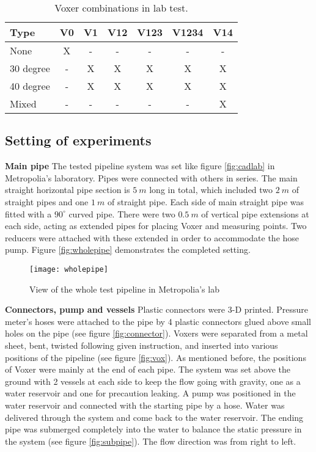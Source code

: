 \begin{table}[h]
  \centering
  \caption{Voxer combinations in lab test.}
  \begin{tabular}{l*{6}{c}}
Type             & V0 & V1 & V12 & V123 & V1234 & V14 \\
\hline
None & X & - & - & - & - & -   \\
30 degree           & - & X & X & X &  X & X  \\
40 degree           & - & X & X & X &  X & X   \\
Mixed     & - & - & - & - & - & X   \\
\end{tabular}
  \label{table:combi}
\end{table}

\subsection{Setting of experiments}

\textbf{Main pipe} \newline
The tested pipeline system was set like figure \vref{fig:cadlab} in Metropolia’s laboratory.  Pipes were connected with others in series. The main straight horizontal pipe section is $5\ m$ long in total, which included two $2\ m$ of straight pipes and one $1\ m$ of straight pipe. Each side of main straight pipe was fitted with a $90^{\circ}$ curved pipe. There were two $0.5\ m$ of vertical pipe extensions at each side, acting as extended pipes for placing Voxer and measuring points. Two reducers were attached with these extended in order to accommodate the hose pump. Figure \vref{fig:wholepipe} demonstrates the completed setting.

\begin{figure}[h]
  \centering
  \texttt{[image: wholepipe]}
  \caption{View of the whole test pipeline in Metropolia's lab }
  \label{fig:wholepipe}
\end{figure}
\newpage

\textbf{Connectors, pump and vessels}\newline
Plastic connectors were 3-D printed. Pressure meter’s hoses were attached to the pipe by 4 plastic connectors glued above small holes on the pipe (see figure \vref{fig:connector}). Voxers were separated from a metal sheet, bent, twisted following given instruction, and inserted into various positions of the pipeline (see figure \vref{fig:vox}). As mentioned before, the positions of Voxer were mainly at the end of each pipe. The system was set above the ground with 2 vessels at each side to keep the flow going with gravity, one as a water reservoir and one for precaution leaking. A pump was positioned in the water reservoir and connected with the starting pipe by a hose. Water was delivered through the system and come back to the water reservoir. The ending pipe was submerged completely into the water to balance the static pressure in the system (see figure \ref{fig:subpipe}). The flow direction was from right to left. 

